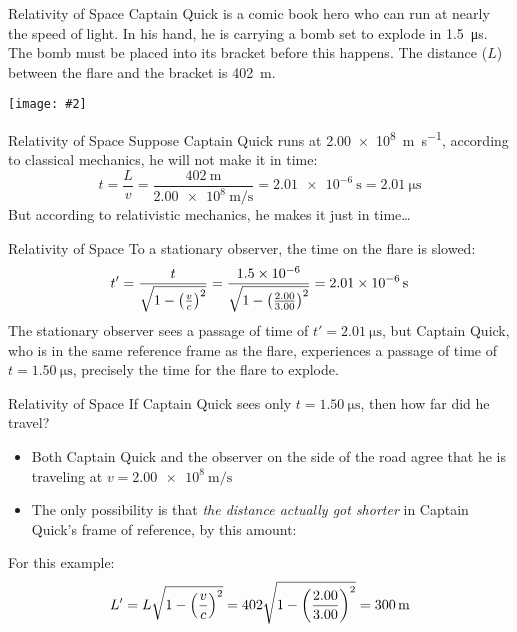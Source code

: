 \documentclass[12pt,compress,aspectratio=169]{beamer}
\newcommand{\pic}[2]{\texttt{[image: \#2]}}
\newcommand{\bigsqrt}{\ensuremath\sqrt{1-\left(\frac{v}{c}\right)^2}}
\newcommand{\eq}[2]{\vspace{#1}{\Large\begin{displaymath}#2\end{displaymath}}}
\begin{document}
\begin{frame}{Relativity of Space}
  Captain Quick is a comic book hero who can run at nearly the speed of light.
  In his hand, he is carrying a bomb set to explode in \SI{1.5}{\micro\second}.
  The bomb must be placed into its bracket before this happens. The distance
  ($L$) between the flare and the bracket is \SI{402}{\metre}.
  \begin{center}
    \vspace{-.15in}\pic{.7}{graphics/captain-quick.png}
  \end{center}
\end{frame}


\begin{frame}{Relativity of Space}
  Suppose Captain Quick runs at \SI{2.00e8}{\metre\per\second}, according to
  classical mechanics, he will not make it in time:
  \begin{displaymath}
    t= \frac{L}{v}=\frac{\SI{402}{\metre}}{\SI{2.00e8}{\metre\per\second}}
    =\SI{2.01e-6}{\second}=\SI{2.01}{\micro\second}
  \end{displaymath}
  But according to relativistic mechanics, he makes it just in time\ldots
\end{frame}


\begin{frame}{Relativity of Space}
  To a stationary observer, the time on the flare is slowed:
  \begin{displaymath}
    t'
    = \frac{t}{\bigsqrt}
    = \frac{\num{1.5e-6}}{\sqrt{1-\left(\frac{2.00}{3.00}\right)^2}}
    = \SI{2.01e-6}{\second}
  \end{displaymath}
  The stationary observer sees a passage of time of
  $t'=\SI{2.01}{\micro\second}$, but Captain Quick, who is in the same
  reference frame as the flare, experiences a passage of time of
  $t=\SI{1.50}{\micro\second}$, precisely the time for the flare to explode.
\end{frame}


\begin{frame}{Relativity of Space}
  If Captain Quick sees only $t=\SI{1.50}{\micro\second}$, then how far did he
  travel?
  \begin{itemize}
  \item Both Captain Quick and the observer on the side of the road agree that
    he is traveling at $v=\SI{2.00e8}{\metre\per\second}$
  \item The only possibility is that \emph{the distance actually got shorter}
    in Captain Quick's frame of reference, by this amount:
    
    \eq{-.2in}{
      \boxed{L'=L\bigsqrt}
    }
  \end{itemize}
  For this example:
  \begin{displaymath}
    L'=L\bigsqrt=402\sqrt{1-\left(\frac{2.00}{3.00}\right)^2}=\SI{300}{\metre}
  \end{displaymath}
\end{frame}
\end{document}
